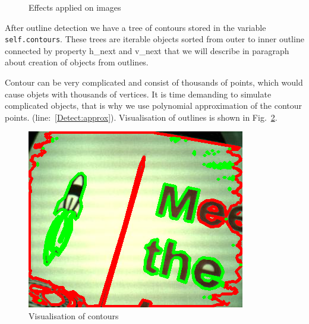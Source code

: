 \documentclass{ifacconf}
\begin{document}
\begin{figure}[h]
  \center
\caption{Effects applied on images}
\label{fig:operations}
\end{figure}

After outline detection we have a tree of contours stored in the variable
\lstinline{self.contours}. These trees are iterable objects sorted from outer to
inner outline connected by property h\_next and v\_next that we will describe in
paragraph about creation of objects from outlines.

Contour can be very complicated and consist of thousands of points, which
would cause objets with thousands of vertices. It is time demanding to
simulate complicated objects, that is why we use polynomial approximation of
the contour points. (line:~\ref{Detect:approx}). Visualisation of outlines is
shown in Fig.~\ref{fig:contours}.

\begin{figure}[h]
\center
\includegraphics[width=0.8\columnwidth]{images/5test-contours.png}
\caption{Visualisation of contours}
\label{fig:contours}
\end{figure}
\end{document}
